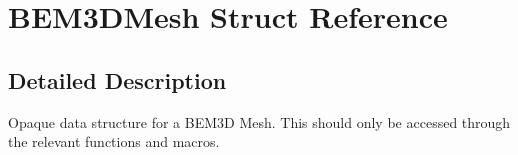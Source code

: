 \section{B\+E\+M3\+D\+Mesh Struct Reference}
\label{structBEM3DMesh}


\subsection{Detailed Description}
Opaque data structure for a B\+E\+M3\+D Mesh. This should only be accessed through the relevant functions and macros. 